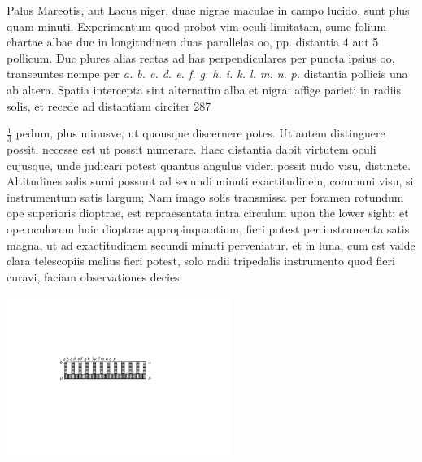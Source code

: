 Palus Mareotis\protect{}, aut Lacus niger\protect{}, duae nigrae maculae in campo lucido, sunt plus quam minuti. Experimentum quod probat vim oculi limitatam, sume folium chartae albae duc in longitudinem duas parallelas oo, pp. distantia 4 aut 5 pollicum. Duc plures alias rectas ad has perpendiculares per puncta ipsius oo, transeuntes nempe per \textit{a. b. c. d. e. f. g. h. i. k. l. m. n.}  \textit{p.} distantia pollicis una ab altera. Spatia intercepta sint alternatim alba et nigra: affige parieti in radiis solis, et recede ad distantiam circiter 287 \rule[-4mm]{0mm}{10mm}$\displaystyle\frac{1}{3}$ pedum, plus minusve, ut quousque discernere potes. Ut autem distinguere possit, necesse est ut possit numerare. Haec distantia dabit virtutem oculi cujusque, unde judicari potest quantus angulus videri possit nudo visu, distincte. Altitudines solis sumi possunt ad secundi minuti exactitudinem, communi visu, si instrumentum satis largum; Nam imago solis transmissa per foramen rotundum ope superioris dioptrae\protect{}, est repraesentata intra circulum upon the lower sight; et ope oculorum huic dioptrae\protect{} appropinquantium, fieri potest per instrumenta satis magna, ut ad exactitudinem secundi minuti perveniatur.  et in luna, cum est valde clara  telescopiis\protect{} melius fieri potest, solo radii tripedalis instrumento quod fieri curavi, faciam observationes decies\\
\pend
{}
\vspace{0.5em}
\pstart
\begin{center}  
   \hspace{13mm} \includegraphics[trim = 0mm 5mm 0mm 0mm, clip, width=0.55\textwidth]{images/lh0351502_10r-d1.pdf}
\newline
{}
\end{center}  
